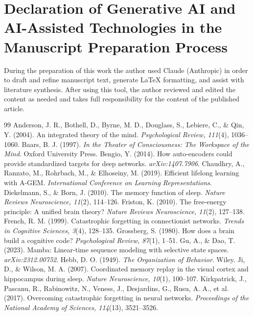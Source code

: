 \documentclass[11pt]{article}
\begin{document}
\section*{Declaration of Generative AI and AI-Assisted Technologies in the Manuscript Preparation Process}
During the preparation of this work the author used Claude (Anthropic) in order to draft and refine manuscript text, generate \LaTeX{} formatting, and assist with literature synthesis. After using this tool, the author reviewed and edited the content as needed and takes full responsibility for the content of the published article.

\begin{thebibliography}{99}
 Anderson, J. R., Bothell, D., Byrne, M. D., Douglass, S., Lebiere, C., \& Qin, Y. (2004). An integrated theory of the mind. \textit{Psychological Review, 111}(4), 1036--1060.
 Baars, B. J. (1997). \textit{In the Theater of Consciousness: The Workspace of the Mind}. Oxford University Press.
 Bengio, Y. (2014). How auto-encoders could provide standardized targets for deep networks. \textit{arXiv:1407.7906}.
 Chaudhry, A., Ranzato, M., Rohrbach, M., \& Elhoseiny, M. (2019). Efficient lifelong learning with A-GEM. \textit{International Conference on Learning Representations}.
 Diekelmann, S., \& Born, J. (2010). The memory function of sleep. \textit{Nature Reviews Neuroscience, 11}(2), 114--126.
 Friston, K. (2010). The free-energy principle: A unified brain theory? \textit{Nature Reviews Neuroscience, 11}(2), 127--138.
 French, R. M. (1999). Catastrophic forgetting in connectionist networks. \textit{Trends in Cognitive Sciences, 3}(4), 128--135.
 Grossberg, S. (1980). How does a brain build a cognitive code? \textit{Psychological Review, 87}(1), 1--51.
 Gu, A., \& Dao, T. (2023). Mamba: Linear-time sequence modeling with selective state spaces. \textit{arXiv:2312.00752}.
 Hebb, D. O. (1949). \textit{The Organization of Behavior}. Wiley.
 Ji, D., \& Wilson, M. A. (2007). Coordinated memory replay in the visual cortex and hippocampus during sleep. \textit{Nature Neuroscience, 10}(1), 100--107.
 Kirkpatrick, J., Pascanu, R., Rabinowitz, N., Veness, J., Desjardins, G., Rusu, A. A., et al. (2017). Overcoming catastrophic forgetting in neural networks. \textit{Proceedings of the National Academy of Sciences, 114}(13), 3521--3526.

\end{thebibliography}
\end{document}
